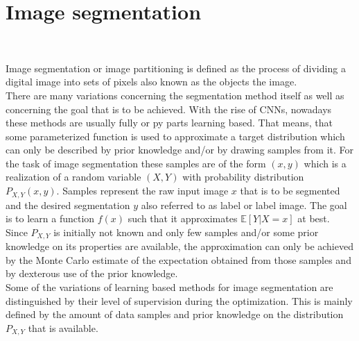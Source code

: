 \section{Image segmentation}~\label{sec:prel_imagesegmentation}

Image segmentation or image partitioning is defined as the process of dividing a digital image into sets of pixels also known as the objects the image.\\
There are many variations concerning the segmentation method itself as well as concerning the goal that is to be achieved. With the rise of CNNs, nowadays these methods are usually fully or py parts learning based. That means, that some parameterized function is used to approximate a target distribution which can only be described by prior knowledge and/or by drawing samples from it. For the task of image segmentation these samples are of the form $(x, y)$ which is a realization of a random variable $(X, Y)$ with probability distribution $P_{X, Y}(x, y)$. Samples represent the raw input image $x$ that is to be segmented and the desired segmentation $y$ also referred to as label or label image. The goal is to learn a function $f(x)$ such that it approximates $\mathbb{E}[Y|X=x]$ at best. Since $P_{X, Y}$ is initially not known and only few samples and/or some prior knowledge on its properties are available, the approximation can only be achieved by the Monte Carlo estimate of the expectation obtained from those samples and by dexterous use of the prior knowledge. \\
Some of the variations of learning based methods for image segmentation are distinguished by their level of supervision during the optimization. This is mainly defined by the amount of data samples and prior knowledge on the distribution $P_{X, Y}$ that is available.

